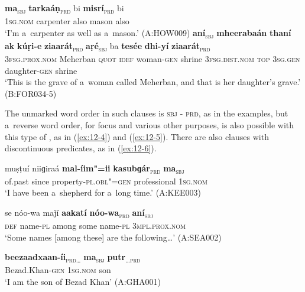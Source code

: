 \ex
\label{ex:12-2}
\gll {\ob}\textbf{ma}{\cb}\textsubscript{\textsc{\upshape sbj}} {\ob}\textbf{tarkaáṇ}{\cb}\textsubscript{\textsc{\upshape prd}} bi
     {\ob}\textbf{misrí}{\cb}\textsubscript{\textsc{\upshape prd}} bi \\
\textsc{1sg.nom} carpenter also mason also  \\
\glt `I'm a~carpenter as well as a~mason.' (A:HOW009) 
\ex
\label{ex:12-3}
\gll {\ob}\textbf{aní}{\cb}\textsubscript{\textsc{\upshape sbj}} {\ob}\textbf{mheerabaán} \textbf{thaní} \textbf{ak} \textbf{kúṛi-e} \textbf{ziaarát}{\cb}\textsubscript{\textsc{\upshape prd}} {\ob}\textbf{aṛé}{\cb}\textsubscript{\textsc{\upshape sbj}} ba {\ob}\textbf{tesée} \textbf{dhi-yí} \textbf{ziaarát}{\cb}\textsubscript{\textsc{\upshape prd}}\\
\textsc{3fsg.prox.nom} Meherban \textsc{quot} \textsc{idef} woman-\textsc{gen}  shrine \textsc{3fsg.dist.nom} \textsc{top} \textsc{3sg.gen} daughter-\textsc{gen}  shrine \\
\glt `This is the grave of a~woman called Meherban, and that is her daughter's grave.' (B:FOR034-5)
\z

The unmarked word order in such clauses is \textsc{sbj - prd}, as in the examples, but a~reverse word order, for focus and various other  purposes, is also possible with this type of , as in (\ref{ex:12-4}) and (\ref{ex:12-5}). There are also clauses with discontinuous predicates, as in (\ref{ex:12-6}).

\begin{exe}
\ex
\label{ex:12-4}
\gll muṣṭuí niiɡiraá {\ob}\textbf{mal-íim"=ii} \textbf{kasubɡár}{\cb}\textsubscript{\textsc{\upshape prd}} {\ob}\textbf{ma}{\cb}\textsubscript{\textsc{\upshape sbj}}\\
of.past since property-\textsc{pl.obl"=gen} professional \textsc{1sg.nom}  \\
\glt `I have been a~shepherd for a~long time.' (A:KEE003)
\end{exe}
\begin{exe}
\ex
\label{ex:12-5}
\gll se nóo-wa maǰí {\ob}\textbf{aakatí} \textbf{nóo-wa}{\cb}\textsubscript{\textsc{\upshape prd}} {\ob}\textbf{aní}{\cb}\textsubscript{\textsc{\upshape sbj}}\\
\textsc{def} name-\textsc{pl} among some name-\textsc{pl} 3\textsc{mpl.prox.nom} \\
\glt `Some names [among these] are the following{\ldots}' (A:SEA002)
\end{exe}
\begin{exe}
\ex
\label{ex:12-6}
\gll {\ob}\textbf{beezaadxaan-íi}{\cb}\textsubscript{\textsc{\upshape prd{\ldots}}} {\ob}\textbf{ma}{\cb}\textsubscript{\textsc{\upshape sbj}} {\ob}\textbf{putr}{\cb}\textsubscript{\textsc{{\ldots}\upshape prd}}\\
Bezad.Khan-\textsc{gen} \textsc{1sg.nom} son\\
\glt `I am the son of Bezad Khan' (A:GHA001)
\end{exe}

